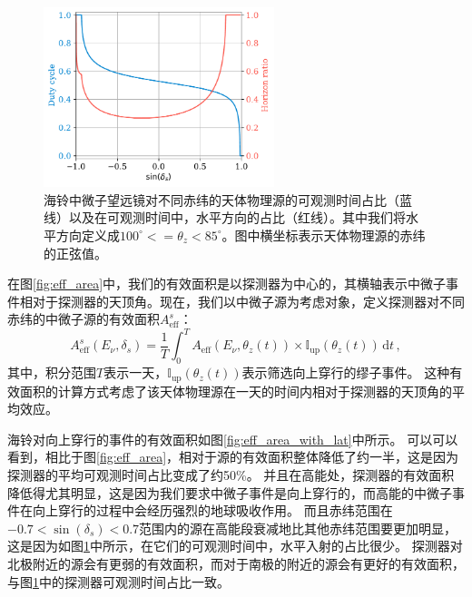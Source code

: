 \begin{figure}[!htb]%
    \centering
    \includegraphics[width=0.60\textwidth]{img/source_zenith_duty_cycle.pdf}
    \caption{海铃中微子望远镜对不同赤纬的天体物理源的可观测时间占比（蓝线）以及在可观测时间中，水平方向的占比（红线）。其中我们将水平方向定义成$100^\circ<= \theta_z <85^\circ$。图中横坐标表示天体物理源的赤纬的正弦值。}
    \label{fig:source_zenith_duty_cycle}
\end{figure}

在图\ref{fig:eff_area}中，我们的有效面积是以探测器为中心的，其横轴表示中微子事件相对于探测器的天顶角。现在，我们以中微子源为考虑对象，定义探测器对不同赤纬的中微子源的有效面积$A_\mathrm{eff}^s$：
\begin{equation}
    A_\mathrm{eff}^s(E_\nu, \delta_s) = \frac{1}{T} \int_0^T A_\mathrm{eff}(E_\nu, \theta_z(t)) \times \mathbb{I}_\mathrm{up}(\theta_z(t)) \, \mathrm{d} t \,   ,
\end{equation}
其中，积分范围$T$表示一天，$\mathbb{I}_\mathrm{up}(\theta_z(t))$表示筛选向上穿行的缪子事件。
这种有效面积的计算方式考虑了该天体物理源在一天的时间内相对于探测器的天顶角的平均效应。

海铃对向上穿行的事件的有效面积如图\ref{fig:eff_area_with_lat}中所示。
可以可以看到，相比于图\ref{fig:eff_area}，相对于源的有效面积整体降低了约一半，这是因为探测器的平均可观测时间占比变成了约50\%。
并且在高能处，探测器的有效面积降低得尤其明显，这是因为我们要求中微子事件是向上穿行的，而高能的中微子事件在向上穿行的过程中会经历强烈的地球吸收作用。
而且赤纬范围在$-0.7 < \sin(\delta_s) < 0.7$范围内的源在高能段衰减地比其他赤纬范围要更加明显，这是因为如图\ref{fig:source_zenith_duty_cycle}中所示，在它们的可观测时间中，水平入射的占比很少。
探测器对北极附近的源会有更弱的有效面积，而对于南极的附近的源会有更好的有效面积，与图\ref{fig:source_zenith_duty_cycle}中的探测器可观测时间占比一致。

